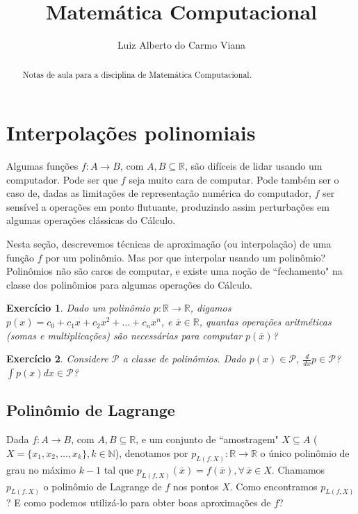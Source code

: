 \documentclass[]{article}
\title{Matemática Computacional}
\author{Luiz Alberto do Carmo Viana}
\newtheorem{exercicio}{Exercício}
\numberwithin{equation}{section}
\begin{document}
\maketitle

\begin{abstract}
Notas de aula para a disciplina de Matemática Computacional.
\end{abstract}

\tableofcontents

\pagebreak

\section{Interpolações polinomiais}

Algumas funções $f : A \to B$, com $A, B \subseteq \mathbb{R}$, são difíceis de lidar usando um computador. Pode ser que $f$ seja muito cara de computar. Pode também ser o caso de, dadas as limitações de representação numérica do computador, $f$ ser sensível a operações em ponto flutuante, produzindo assim perturbações em algumas operações clássicas do Cálculo.

Nesta seção, descrevemos técnicas de aproximação (ou interpolação) de uma função $f$ por um polinômio. Mas por que interpolar usando um polinômio? Polinômios não são caros de computar, e existe uma noção de ``fechamento" na classe dos polinômios para algumas operações do Cálculo.

\begin{exercicio}
	Dado um polinômio $p : \mathbb{R} \to \mathbb{R}$, digamos $p(x) = c_0 + c_1x + c_2x^2 + \dots + c_nx^n$, e $\overline{x} \in \mathbb{R}$, quantas operações aritméticas (somas e multiplicações) são necessárias para computar $p(\overline{x})$?
\end{exercicio}

\begin{exercicio}
	Considere $\mathcal{P}$ a classe de polinômios. Dado $p(x) \in \mathcal{P}$, $\frac{d}{dx} p \in \mathcal{P}$? $\int p(x)dx \in \mathcal{P}$?
\end{exercicio}

\subsection{Polinômio de Lagrange}

Dada $f : A \to B$, com $A, B \subseteq \mathbb{R}$, e um conjunto de ``amostragem" $X \subseteq A$ ($X = \{x_1, x_2, \dots, x_k\}, k \in \mathbb{N}$), denotamos por $p_{L(f, X)} : \mathbb{R} \to \mathbb{R}$ o único polinômio de grau no máximo $k - 1$ tal que $p_{L(f, X)}(\overline{x}) = f(\overline{x}), \forall\, \overline{x} \in X$. Chamamos $p_{L(f, X)}$ o polinômio de Lagrange de $f$ nos pontos $X$. Como encontramos $p_{L(f, X)}$? E como podemos utilizá-lo para obter boas aproximações de $f$?
\end{document}
